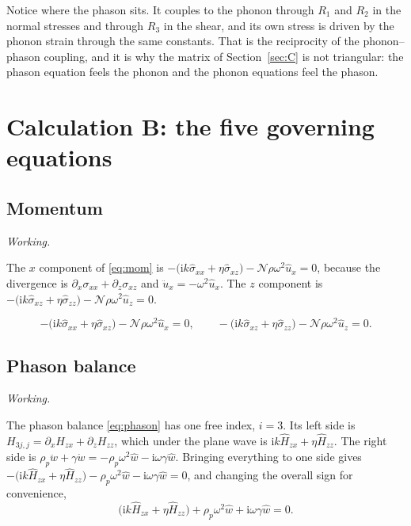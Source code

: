 \documentclass[11pt,a4paper]{article}
\newif\ifshowworked \showworkedtrue
\newenvironment{worked}{\ifshowworked\par\smallskip\noindent\textit{Working.}\par\else\setbox0\vbox\bgroup\fi}{\ifshowworked\par\smallskip\else\egroup\fi}
\newcommand{\Nc}{\mathcal{N}}
\newcommand{\ii}{\mathrm{i}}
\newcommand{\bx}{\hat u_x}
\newcommand{\bz}{\hat u_z}
\newcommand{\bw}{\hat w}
\begin{document}
Notice where the phason sits. It couples to the phonon through $R_1$ and $R_2$ in the normal stresses and
through $R_3$ in the shear, and its own stress is driven by the phonon strain through the same constants.
That is the reciprocity of the phonon--phason coupling, and it is why the matrix of Section~\ref{sec:C} is
not triangular: the phason equation feels the phonon and the phonon equations feel the phason.

\section{Calculation B: the five governing equations}\label{sec:B}

\subsection{Momentum}

\begin{worked}
The $x$ component of \eqref{eq:mom} is $-\bigl(\ii k\hat\sigma_{xx}+\eta\hat\sigma_{xz}\bigr)-\Nc\rho\omega^2\bx=0$,
because the divergence is $\partial_x\sigma_{xx}+\partial_z\sigma_{xz}$ and $\ddot u_x=-\omega^2\bx$. The $z$
component is $-\bigl(\ii k\hat\sigma_{xz}+\eta\hat\sigma_{zz}\bigr)-\Nc\rho\omega^2\bz=0$.
\end{worked}

\noindent
\begin{equation}\label{eq:g1}
-\bigl(\ii k\hat\sigma_{xx}+\eta\hat\sigma_{xz}\bigr)-\Nc\rho\omega^2\bx=0,\qquad
-\bigl(\ii k\hat\sigma_{xz}+\eta\hat\sigma_{zz}\bigr)-\Nc\rho\omega^2\bz=0 .
\end{equation}

\subsection{Phason balance}

\begin{worked}
The phason balance \eqref{eq:phason} has one free index, $i=3$. Its left side is
$H_{3j,j}=\partial_xH_{zx}+\partial_zH_{zz}$, which under the plane wave is $\ii k\hat H_{zx}+\eta\hat H_{zz}$.
The right side is $\rho_p\ddot w+\gamma\dot w=-\rho_p\omega^2\bw-\ii\omega\gamma\bw$. Bringing everything to
one side gives $-\bigl(\ii k\hat H_{zx}+\eta\hat H_{zz}\bigr)-\rho_p\omega^2\bw-\ii\omega\gamma\bw=0$, and
changing the overall sign for convenience,
\[
\bigl(\ii k\hat H_{zx}+\eta\hat H_{zz}\bigr)+\rho_p\omega^2\bw+\ii\omega\gamma\bw=0 .
\]
\end{worked}
\end{document}
